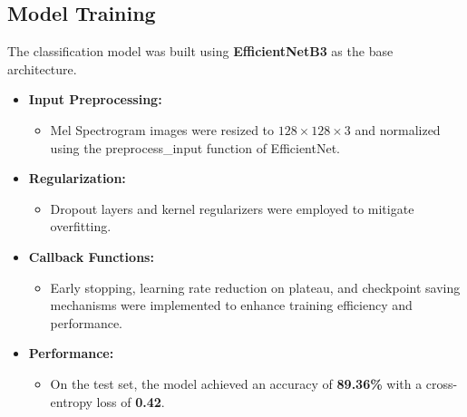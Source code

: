 \subsection{Model Training}
The classification model was built using \textbf{EfficientNetB3} as the base
architecture.

\begin{itemize}
    \item \textbf{Input Preprocessing:}
          \begin{itemize}
              \item Mel Spectrogram images were resized to \(128 \times 128 \times 3\) and
                    normalized using the preprocess\_input function of EfficientNet.
          \end{itemize}

    \item \textbf{Regularization:}
          \begin{itemize}
              \item Dropout layers and kernel regularizers were employed to mitigate overfitting.
          \end{itemize}

    \item \textbf{Callback Functions:}
          \begin{itemize}
              \item Early stopping, learning rate reduction on plateau, and checkpoint saving
                    mechanisms were implemented to enhance training efficiency and performance.
          \end{itemize}

    \item \textbf{Performance:}
          \begin{itemize}
              \item On the test set, the model achieved an accuracy of \textbf{89.36\%} with a
                    cross-entropy loss of \textbf{0.42}.
          \end{itemize}
\end{itemize}


